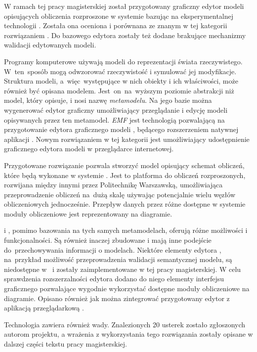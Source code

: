 W ramach tej pracy magisterskiej został przygotowany graficzny edytor modeli
opisujących obliczenia rozproszone w systemie \BalticLSC{} bazując na
eksperymentalnej technologii \SiriusWeb{}. Została ona oceniona i porównana ze
znanym w tej kategorii rozwiązaniem \SiriusDesktop{}. Do bazowego edytora
\SiriusWeb{} zostały też dodane brakujące mechanizmy walidacji edytowanych
modeli.


Programy komputerowe używają modeli do reprezentacji świata rzeczywistego.
W~ten~sposób mogą odwzorować rzeczywistość i symulować jej modyfikacje.
Struktura
modeli, a~więc~występujące w nich obiekty i ich właściwości, może również być
opisana
modelem. Jest~on~na~wyższym poziomie abstrakcji niż model, który opisuje, i
nosi nazwę \emph{metamodelu}.
Na jego bazie można wygenerować edytor graficzny umożliwiający przeglądanie
i edycję modeli opisywanych przez ten metamodel. \emph{\acrlong{EMF}} jest
technologią pozwalającą na przygotowanie edytora graficznego modeli
\SiriusDesktop{},
będącego rozszerzeniem natywnej aplikacji \Eclipse{}. Nowym rozwiązaniem w tej
kategorii jest \SiriusWeb{} umożliwiający udostępnienie graficznego edytora
modeli w przeglądarce internetowej.

Przygotowane rozwiązanie pozwala stworzyć model opisujący schemat obliczeń,
które będą wykonane w systemie \BalticLSC{}. Jest to platforma do obliczeń
rozproszonych, rozwijana między innymi przez Politechnikę Warszawską,
umożliwiająca przeprowadzenie obliczeń na~dużą skalę używając potencjalnie
wielu węzłów obliczeniowych jednocześnie.
Przepływ danych przez różne dostępne w systemie moduły obliczeniowe jest
reprezentowany na diagramie.

\SiriusDesktop{} i \SiriusWeb{}, pomimo bazowania na tych samych metamodelach,
oferują różne możliwości i funkcjonalności. Są również inaczej zbudowane i mają
inne podejście do~przechowywania informacji o modelach. Niektóre elementy
edytora \SiriusDesktop{}, na~przykład możliwość przeprowadzenia walidacji
semantycznej modelu, są niedostępne w~\SiriusWeb{} i zostały zaimplementowane w
tej pracy magisterskiej. W celu sprawdzenia rozszerzalności edytora dodano do
niego elementy interfejsu graficznego pozwalające wygodnie wykorzystać
dostępne moduły obliczeniowe na diagramie. Opisano również jak można
zintegrować przygotowany edytor z aplikacją przeglądarkową \BalticLSC{}.

Technologia \SiriusWeb{} zawiera również wady. Znalezionych 20 usterek zostało
zgłoszonych autorom projektu, a wrażenia z wykorzystania tego rozwiązania
zostały opisane w dalszej części tekstu pracy magisterskiej.
